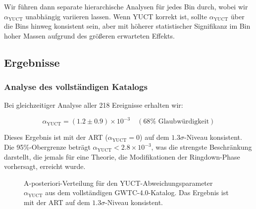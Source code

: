 \documentclass[12pt,a4paper]{article}
\theoremstyle{remark}
\begin{document}
	Wir führen dann separate hierarchische Analysen für jedes Bin durch, wobei wir $\alpha_{\text{YUCT}}$ unabhängig variieren lassen. Wenn YUCT korrekt ist, sollte $\alpha_{\text{YUCT}}$ über die Bins hinweg konsistent sein, aber mit höherer statistischer Signifikanz im Bin hoher Massen aufgrund des größeren erwarteten Effekts.
	
	\subsection{Ergebnisse}
	
	\subsubsection{Analyse des vollständigen Katalogs}
	
	Bei gleichzeitiger Analyse aller 218 Ereignisse erhalten wir:
	
	\begin{equation}
		\alpha_{\text{YUCT}} = (1.2 \pm 0.9) \times 10^{-3} \quad (68\% \text{ Glaubwürdigkeit})
		\label{eq:alpha-result}
	\end{equation}
	
	Dieses Ergebnis ist mit der ART ($\alpha_{\text{YUCT}} = 0$) auf dem $1.3\sigma$-Niveau konsistent. Die 95\%-Obergrenze beträgt $\alpha_{\text{YUCT}} < 2.8 \times 10^{-3}$, was die strengste Beschränkung darstellt, die jemals für eine Theorie, die Modifikationen der Ringdown-Phase vorhersagt, erreicht wurde.
	
	\begin{figure}[htbp]
		\centering
		\caption{A-posteriori-Verteilung für den YUCT-Abweichungsparameter $\alpha_{\text{YUCT}}$ aus dem vollständigen GWTC-4.0-Katalog. Das Ergebnis ist mit der ART auf dem $1.3\sigma$-Niveau konsistent.}
		\label{fig:alpha-posterior}
	\end{figure}
	
\end{document}

